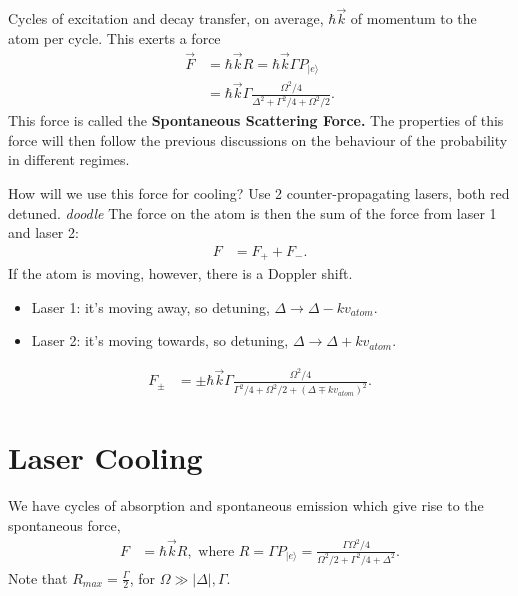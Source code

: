 \documentclass[a4paper, 11pt, normalem]{report}
\begin{document}
Cycles of excitation and decay transfer, on average, $\hbar\vec{k}$ of momentum to the atom per cycle.
This exerts a force
\begin{align}
    \vec{F} &= \hbar\vec{k}R = \hbar\vec{k}\Gamma P_{|e\rangle} \\
            &= \hbar\vec{k}\Gamma\frac{\Omega^2/4}{\Delta^2+\Gamma^2/4+\Omega^2/2}.
\end{align}
This force is called the \textbf{Spontaneous Scattering Force.}
The properties of this force will then follow the previous discussions on the behaviour of the probability in different regimes.

How will we use this force for cooling?
Use 2 counter-propagating lasers, both red detuned.
\emph{doodle}
The force on the atom is then the sum of the force from laser 1 and laser 2:
\begin{align}
    F &= F_+ + F_-.
\end{align}
If the atom is moving, however, there is a Doppler shift.
\begin{itemize}
    \item Laser 1: it's moving away, so detuning, $\Delta\to\Delta-kv_{atom}$.
    \item Laser 2: it's moving towards, so detuning, $\Delta\to\Delta+kv_{atom}$.
\end{itemize}
\begin{align}
    F_{\pm} &= \pm \hbar\vec{k}\Gamma\frac{\Omega^2/4}{\Gamma^2/4 + \Omega^2/2 + (\Delta\mp kv_{atom})^2}.
\end{align}

\chapter{Laser Cooling}
We have cycles of absorption and spontaneous emission which give rise to the spontaneous force,
\begin{align}
    F &= \hbar\vec{k}R, \text{ where } R = \Gamma P_{|e\rangle} = \frac{\Gamma\Omega^2/4}{\Omega^2/2 + \Gamma^2/4 + \Delta^2}.
\end{align}
Note that $R_{max}=\frac{\Gamma}{2}$, for $\Omega\gg|\Delta|,\Gamma$.
\end{document}

